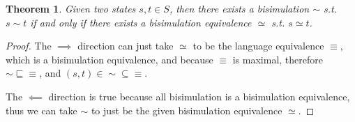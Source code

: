 \documentclass[conference]{IEEEtran}
\newtheorem{theorem}{Theorem}
\newtheorem{lemma}[theorem]{Lemma}
\DeclareMathOperator{\norm}{\mathrm{norm}}
\begin{document}
\begin{theorem}\label{thm:bisim-iff-bisim-equiv}
    Given two states \(s, t ∈ S\), then there exists a bisimulation \(∼\) s.t. \(s ∼ t\) if and only if there exists a bisimulation equivalence \(≃\) s.t. \(s ≃ t\).
\end{theorem}

\begin{proof}
    The \(⟹\) direction can just take \(≃\) to be the language equivalence \(≡\), which is a bisimulation equivalence, and because \(≡\) is maximal, therefore \({∼} ⊑ {≡}\), and \((s, t) ∈ {∼} ⊆ {≡}\).

    The \(⟸\) direction is true because all bisimulation is a bisimulation equivalence, thus we can take \(∼\) to just be the given bisimulation equivalence \(≃\).
\end{proof}



    
\end{document}
